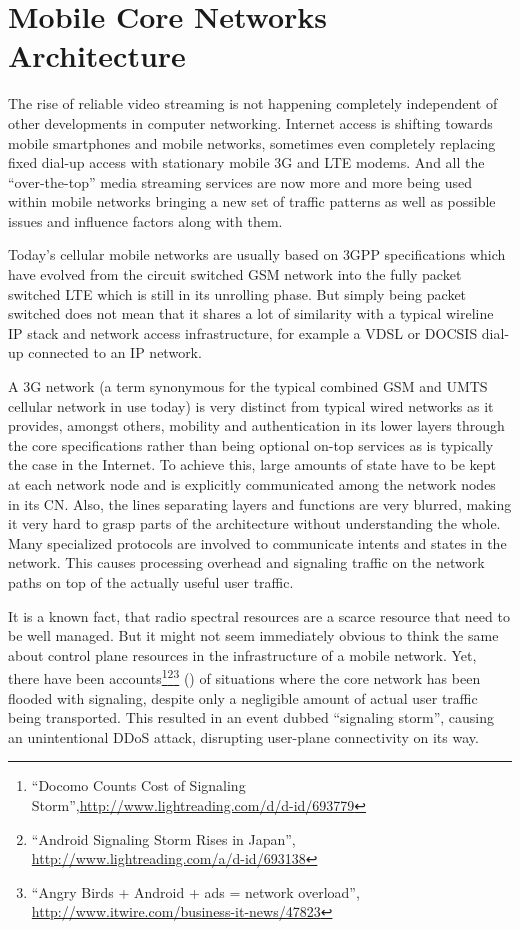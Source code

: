 \chapter{Mobile Core Networks Architecture}
\label{chap:mobilenets}

The rise of reliable video streaming is not happening completely independent of other developments in computer networking. Internet access is shifting towards mobile smartphones and mobile networks, sometimes even completely replacing fixed dial-up access  with stationary mobile \gls{3G} and \gls{LTE} modems. And all the ``over-the-top'' media streaming services are now more and more being used within mobile networks bringing a new set of traffic patterns as well as possible issues and influence factors along with them.

Today's cellular mobile networks are usually based on \gls{3GPP} specifications which have evolved from the circuit switched \gls{GSM} network into the fully packet switched \gls{LTE} which is still in its unrolling phase. But simply being packet switched does not mean that it shares a lot of similarity with a typical wireline \gls{IP} stack and network access infrastructure, for example a \gls{VDSL} or \gls{DOCSIS} dial-up connected to an \gls{IP} network. 

A \gls{3G} network (a term synonymous for the typical combined \gls{GSM} and \gls{UMTS} cellular network in use today) is very distinct from typical wired networks as it provides, amongst others, mobility and authentication in its lower layers through the core specifications rather than being optional on-top services as is typically the case in the Internet. To achieve this, large amounts of state have to be kept at each network node and is explicitly communicated among the network nodes in its \gls{CN}. Also, the lines separating layers and functions are very blurred, making it very hard to grasp parts of the architecture without understanding the whole. Many specialized protocols are involved to communicate intents and states in the network. This causes processing overhead and signaling traffic on the network paths on top of the actually useful user traffic. 

It is a known fact, that radio spectral resources are a scarce resource that need to be well managed. But it might not seem immediately obvious to think the same about control plane resources in the infrastructure of a mobile network. Yet, there have been accounts\footnote{``Docomo Counts Cost of Signaling Storm'',\url{http://www.lightreading.com/d/d-id/693779}}\footnote{``Android Signaling Storm Rises in Japan'', \url{http://www.lightreading.com/a/d-id/693138}}\footnote{``Angry Birds + Android + ads = network overload'', \url{http://www.itwire.com/business-it-news/47823}} (\cite{huawei2011storm}) of situations where the core network has been flooded with signaling, despite only a negligible amount of actual user traffic being transported. This resulted in an event dubbed ``signaling storm'', causing an unintentional \gls{DDoS} attack, disrupting user-plane connectivity on its way.

